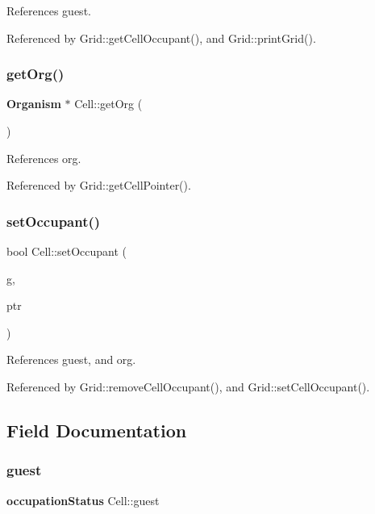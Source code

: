 References guest.



Referenced by Grid\+::get\+Cell\+Occupant(), and Grid\+::print\+Grid().

\mbox{\label{classCell_ae2d42272066779d88a0e9b7306eeecb3}} 
\subsubsection{get\+Org()}
{\footnotesize\ttfamily \textbf{ Organism} $\ast$ Cell\+::get\+Org (\begin{DoxyParamCaption}{ }\end{DoxyParamCaption})}



References org.



Referenced by Grid\+::get\+Cell\+Pointer().

\mbox{\label{classCell_adbfb64113686df0deb3958a8aba9dd2b}} 
\subsubsection{set\+Occupant()}
{\footnotesize\ttfamily bool Cell\+::set\+Occupant (\begin{DoxyParamCaption}\item[{\textbf{ occupation\+Status}}]{g,  }\item[{\textbf{ Organism} $\ast$}]{ptr }\end{DoxyParamCaption})}



References guest, and org.



Referenced by Grid\+::remove\+Cell\+Occupant(), and Grid\+::set\+Cell\+Occupant().



\subsection{Field Documentation}
\mbox{\label{classCell_aafc273a5125cf29742a8df6f5a5a881c}} 
\subsubsection{guest}
{\footnotesize\ttfamily \textbf{ occupation\+Status} Cell\+::guest\hspace{0.3cm}{\ttfamily [private]}}



